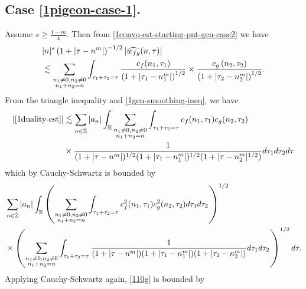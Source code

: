 \subsection{Case \eqref{1pigeon-case-1}.} Assume $s \ge \frac{1-m}{4}$. Then from 
\eqref{1convo-est-starting-pnt-gen-case2} we have
%
%
\begin{equation}
	\label{1gen-smoothing-ineq}
	\begin{split}
		& |n|^s \left( 1 + | \tau - n^m | \right)^{-1/2} | 
		\widehat{w_{fg}}(n, \tau) | 
		\\
		& \lesssim \sum_{\substack{n_1 \neq0, n_2 \neq 0 \\n_1 + n_2 =n}} \int_{\tau_1 + \tau_2 = \tau}\frac{c_f(n_1, \tau_1)}{\left( 1 + | 
		\tau_1 -  n_1^m| \right)^{1/2}}
		\times \frac{c_g\left( n_2, \tau_2\right)}{\left( 1 + | \tau_2 -n_2^m|
		\right)^{1/2}}.
	\end{split}
\end{equation}
%
%
From the triangle inequality and \eqref{1gen-smoothing-ineq}, we have
%
%
\begin{equation*}
	\begin{split}
	 |\eqref{1duality-est}|
	& \lesssim \sum_{n \in \dot{\mathbb{Z}}} |a_{n}| \int_{\mathbb{R}} \sum_{\substack{n_1 \neq 0, n_2 \neq 0
		\\ n_1 +n_2 =n}} \int_{\tau_1 + \tau_2 = \tau} c_f(n_1, \tau_1)
		c_g(n_2, \tau_2)
		\\
		& \times \frac{1}{(1 + | \tau - n^m |)^{1/2}(1 + |
		\tau_{1}-n_{1}^m |)^{1/2}(1 + | \tau-n_{2}^m |^{1/2})} d \tau_1 d \tau_2
		d \tau
	\end{split}
\end{equation*}
%
%
which by Cauchy-Schwartz is bounded by
%
%
\begin{equation}
	\label{110g}
	\begin{split}
		& \sum_{n \in \dot{\mathbb{Z}}} |a_n| \int_{\mathbb{R}} \left(  \sum_{\substack{n_1 \neq 0, n_2
		\neq 0 \\n_1 +n_2 =n}} \int_{\tau_1 + \tau_2 = \tau} c_{f}^{2}(n_1, \tau_1)
		c_{g}^{2} (n_2, \tau_2) d \tau_1 d \tau_2 \right)^{1/2} 
		\\
		& \times \left( \sum_{\substack{n_1 \neq 0, n_2 \neq 0 \\n_1 +n_2 =n}}
		\int_{\tau_1 + \tau_2 = \tau} \frac{1}{(1 + | \tau - n^m |)(1 + | \tau_{1}-n_{1}^m |)(1 + |
		\tau_2 -n_{2}^m |)} d \tau_1 d \tau_2
		\right)^{1/2} d \tau.
	\end{split}
\end{equation}
%
%
Applying Cauchy-Schwartz again, \eqref{110g} is bounded by
